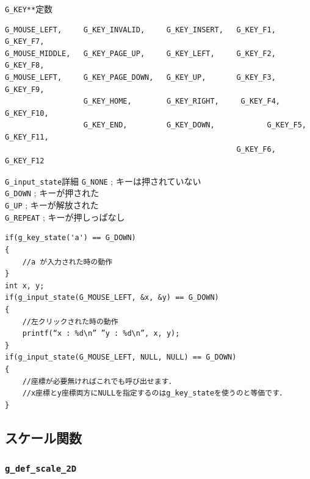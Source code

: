 \documentclass[platex,a4paper,12pt]{jsarticle}%
\begin{document}
\begin{itembox}[l]{\texttt{G\_KEY**}定数}
\begin{verbatim}
G_MOUSE_LEFT,     G_KEY_INVALID,     G_KEY_INSERT,   G_KEY_F1, 	G_KEY_F7,
G_MOUSE_MIDDLE,   G_KEY_PAGE_UP,     G_KEY_LEFT,     G_KEY_F2, 	G_KEY_F8,
G_MOUSE_LEFT,     G_KEY_PAGE_DOWN,   G_KEY_UP,       G_KEY_F3, 	G_KEY_F9,
                  G_KEY_HOME,        G_KEY_RIGHT, 	  G_KEY_F4, 	G_KEY_F10,
                  G_KEY_END,         G_KEY_DOWN,	    	G_KEY_F5, 	G_KEY_F11,
                                                     G_KEY_F6,	  G_KEY_F12
 \end{verbatim}
\end{itembox}
\begin{itembox}[l]{\texttt{G\_input\_state}詳細}
\verb|G_NONE| ; キーは押されていない\\
\verb|G_DOWN| ; キーが押された\\
\verb|G_UP| ; キーが解放された\\
\verb|G_REPEAT| ; キーが押しっぱなし
\begin{verbatim}
if(g_key_state('a') == G_DOWN)
{
    //a が入力された時の動作
}
int x, y;
if(g_input_state(G_MOUSE_LEFT, &x, &y) == G_DOWN)
{
    //左クリックされた時の動作
    printf(“x : %d\n” ”y : %d\n”, x, y);
}
if(g_input_state(G_MOUSE_LEFT, NULL, NULL) == G_DOWN)
{
    //座標が必要無ければこれでも呼び出せます．
    //x座標とy座標両方にNULLを指定するのはg_key_stateを使うのと等価です．
}
\end{verbatim}
\end{itembox}

\clearpage
\subsection{スケール関数}

\subsubsection{\texttt{g\_def\_scale\_2D}}
\end{document}
